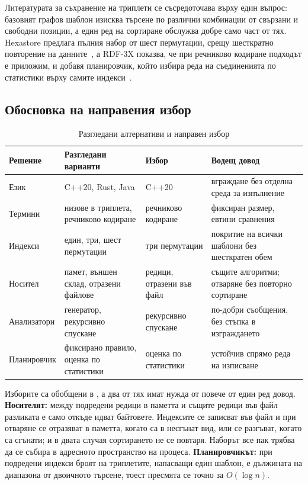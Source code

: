 Литературата за съхранение на триплети се съсредоточава върху един въпрос: базовият графов
шаблон изисква търсене по различни комбинации от свързани и свободни позиции, а един ред на
сортиране обслужва добре само част от тях. Hexastore предлага пълния набор от шест пермутации,
срещу шесткратно повторение на данните~\cite{weiss2008hexastore}, а RDF-3X показва, че при
речниково кодиране подходът е приложим, и добавя планировчик, който избира реда на съединенията
по статистики върху самите индекси~\cite{neumann2010rdf3x}.

\subsection{Обосновка на направения избор}

\begin{table}[H]
\caption{Разгледани алтернативи и направен избор}
\label{tab:alternatives}
\centering
\fontsize{10}{12}\selectfont
\begin{tabular}{@{}L{2.6cm}L{4.2cm}L{3.0cm}L{3.4cm}@{}}
\toprule
\textbf{Решение} & \textbf{Разгледани варианти} & \textbf{Избор} & \textbf{Водещ довод} \\
\midrule
Език & C++20, Rust, Java & C++20 & вграждане без отделна среда за изпълнение \\
Термини & низове в триплета, речниково кодиране & речниково кодиране & фиксиран размер, евтини сравнения \\
Индекси & един, три, шест пермутации & три пермутации & покритие на всички шаблони без шесткратен обем \\
Носител & памет, външен склад, отразени файлове & редици, отразени във файл & същите алгоритми; отваряне без повторно сортиране \\
Анализатори & генератор, рекурсивно спускане & рекурсивно спускане & по-добри съобщения, без стъпка в изграждането \\
Планировчик & фиксирано правило, оценка по статистики & оценка по статистики & устойчив спрямо реда на изписване \\
\bottomrule
\end{tabular}
\end{table}

Изборите са обобщени в , а два от тях имат нужда от повече от един ред
довод. \textbf{Носителят:} между подредени редици в паметта и същите редици във файл разликата
е само откъде идват байтовете. Индексите се записват във файл  и при отваряне
се отразяват в паметта, когато са в несгънат вид, или се разгъват, когато са сгънати; и в
двата случая сортирането не се повтаря. Наборът все пак трябва да се събира в адресното
пространство на процеса. \textbf{Планировчикът:} при
подредени индекси броят на триплетите, напасващи един шаблон, е дължината на диапазона от
двоичното търсене, тоест пресмята се точно за $O(\log n)$.
